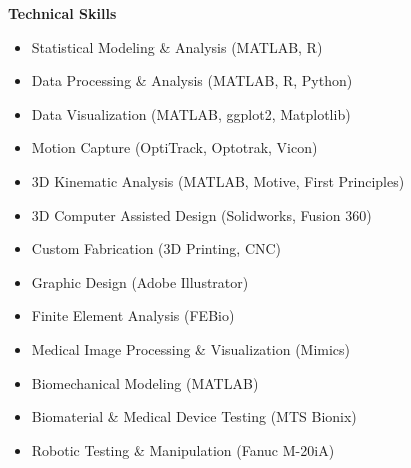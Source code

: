 \documentclass[10pt]{letter}
\begin{document}


\begin{center}
\textbf{\large Technical Skills} \\
\end{center}
\vspace{-10pt}
\begin{multicols}{2}
\begin{itemize}
    \item Statistical Modeling \& Analysis (MATLAB, R)
    \item Data Processing \& Analysis (MATLAB, R, Python)
    \item Data Visualization (MATLAB, ggplot2, Matplotlib)

    \item Motion Capture (OptiTrack, Optotrak, Vicon)
    \item 3D Kinematic Analysis (MATLAB, Motive, First Principles)
    
    \item 3D Computer Assisted Design (Solidworks, Fusion 360)
    \item Custom Fabrication (3D Printing, CNC)
    \item Graphic Design (Adobe Illustrator)
    \item Finite Element Analysis (FEBio)
    \item Medical Image Processing \& Visualization (Mimics)
    
    \item Biomechanical Modeling (MATLAB)
    \item Biomaterial \& Medical Device Testing (MTS Bionix)
    \item Robotic Testing \& Manipulation (Fanuc M-20iA)


\end{itemize}
\end{multicols}
\end{document}
